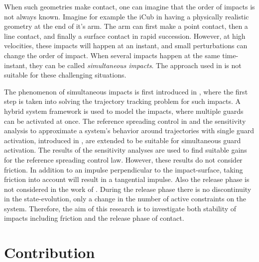 \documentclass[../DC2017114Bouma.tex]{subfiles}
\begin{document}
When such geometries make contact, one can imagine that the order of impacts is not always known. Imagine for example the iCub in \cite{Rijnen2017a} having a physically realistic geometry at the end of it's arm. The arm can first make a point contact, then a line contact, and finally a surface contact in rapid succession.  However, at high velocities, these impacts will happen at an instant, and small perturbations can change the order of impact. When several impacts happen at the same time-instant, they can be called \textit{simultaneous impacts}. The approach used in \cite{Zhao2015} is not suitable for these challenging situations. 

The phenomenon of simultaneous impacts is first introduced in \cite{Chen2018a}, where the first step is taken into solving the trajectory tracking problem for such impacts. A hybrid system framework is used to model the impacts, where multiple guards can be activated at once. The reference spreading control in \cite{Rijnen2016,Rijnen2017} and the sensitivity analysis to approximate a system's behavior around trajectories with single guard activation, introduced in \cite{Saccon2014}, are extended to be suitable for simultaneous guard activation. The results of the sensitivity analyses are used to find suitable gains for the reference spreading control law. However, these results do not consider friction. In addition to an impulse perpendicular to the impact-surface, taking friction into account will result in a tangential impulse. Also the release phase is not considered in the work of \cite{Chen2018a}. During the release phase there is no discontinuity in the state-evolution, only a change in the number of active constraints on the system. Therefore, the aim of this research is to investigate both stability of impacts including friction and the release phase of contact.

\section{Contribution}
\end{document}
